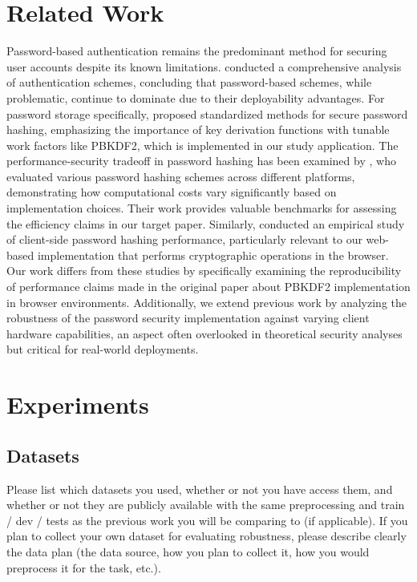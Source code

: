 \documentclass[11pt,a4paper]{article}
\begin{document}
\section{Related Work}
Password-based authentication remains the predominant method for securing user accounts despite its known limitations. \cite{bonneau2012quest} conducted a comprehensive analysis of authentication schemes, concluding that password-based schemes, while problematic, continue to dominate due to their deployability advantages. For password storage specifically, \cite{turan2018recommendation} proposed standardized methods for secure password hashing, emphasizing the importance of key derivation functions with tunable work factors like PBKDF2, which is implemented in our study application.
The performance-security tradeoff in password hashing has been examined by \cite{visconti2020evaluate}, who evaluated various password hashing schemes across different platforms, demonstrating how computational costs vary significantly based on implementation choices. Their work provides valuable benchmarks for assessing the efficiency claims in our target paper. Similarly, \cite{pesante2021empirical} conducted an empirical study of client-side password hashing performance, particularly relevant to our web-based implementation that performs cryptographic operations in the browser. Our work differs from these studies by specifically examining the reproducibility of performance claims made in the original paper about PBKDF2 implementation in browser environments. Additionally, we extend previous work by analyzing the robustness of the password security implementation against varying client hardware capabilities, an aspect often overlooked in theoretical security analyses but critical for real-world deployments.

\section{Experiments}

\subsection{Datasets}
Please list which datasets you used, whether or not you have access them, and whether or not they are publicly available with the same preprocessing and train / dev / tests as the previous work you will be comparing to (if applicable). If you plan to collect your own dataset for evaluating robustness, please describe clearly the data plan (the data source, how you plan to collect it, how you would preprocess it for the task, etc.).
\end{document}
